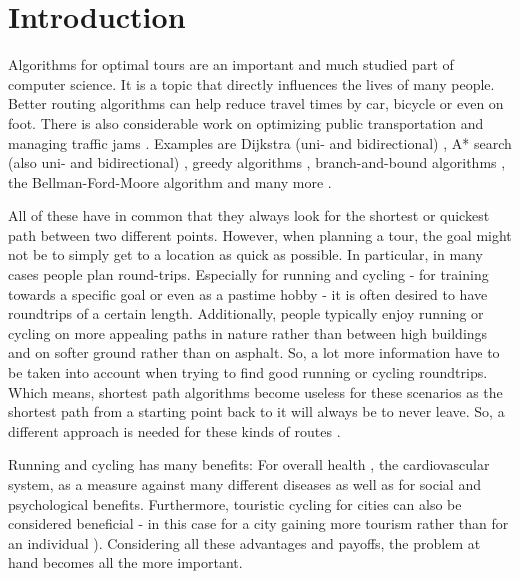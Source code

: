 \chapter{Introduction}
\label{chapter:introduction}


Algorithms for optimal tours are an important and much studied part of computer science.
It is a topic that directly influences the lives of many people.
Better routing algorithms can help reduce travel times by car, bicycle or even on foot. 
There is also considerable work on optimizing public transportation \cite{bast_route_2015, delling_round-based_2015} and managing traffic jams \cite{delling_time-dependent_2011, delling_customizable_2017}. 
Examples are Dijkstra (uni- and bidirectional) \cite{madkour_survey_2017, sommer_shortest-path_2014, wayahdi_greedy_2021}, A* search (also uni- and bidirectional) \cite{madkour_survey_2017, sommer_shortest-path_2014, wayahdi_greedy_2021}, greedy algorithms \cite{madkour_survey_2017, wayahdi_greedy_2021}, branch-and-bound algorithms \cite{lawler_branch-and-bound_1966}, the Bellman-Ford-Moore algorithm \cite{cherkassky_shortest_1996} and many more \cite{delling_engineering_2009, sommer_shortest-path_2014}.

All of these have in common that they always look for the shortest or quickest path between two different points.
However, when planning a tour, the goal might not be to simply get to a location as quick as possible.
In particular, in many cases people plan round-trips.
Especially for running and cycling - for training towards a specific goal or even as a pastime hobby - it is often desired to have roundtrips of a certain length. 
Additionally, people typically enjoy running or cycling on more appealing paths in nature rather than between high buildings and on softer ground rather than on asphalt.
So, a lot more information have to be taken into account when trying to find good running or cycling roundtrips. 
Which means, shortest path algorithms become useless for these scenarios as the shortest path from a starting point back to it will always be to never leave. 
So, a different approach is needed for these kinds of routes \cite{gemsa_efficient_2013}.

Running and cycling has many benefits: For overall health \cite{oja_health_2011, ruegsegger_health_2018, vina_exercise_2012}, the cardiovascular system\cite{nystoriak_cardiovascular_2018}, as a measure against many different diseases\cite{oja_health_2011} as well as for social\cite{mueller_jogging_2007, obrien_jogging_2007, wankel_psychological_1990} and psychological benefits\cite{biddle_psychological_1993, cekin_psychological_2015, szabo_psychological_2013, wankel_psychological_1990}. Furthermore, touristic cycling for cities can also be considered beneficial - in this case for a city gaining more tourism rather than for an individual \cite{blondiau_economic_2016}).
Considering all these advantages and payoffs, the problem at hand becomes all the more important.

